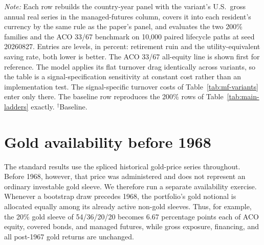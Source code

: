 \documentclass[11pt]{article}
\begin{document}
\begin{table}[H]
\centering
\caption{Lifecycle outcomes with each managed-futures variant in the sleeve}
\label{tab:mf-variant-lifecycle}
\small

\begin{minipage}{0.94\textwidth}\footnotesize
\textit{Note:} Each row rebuilds the country-year panel with the variant's
U.S.\ gross annual real series in the managed-futures column, covers it into
each resident's currency by the same rule as the paper's panel, and evaluates
the two 200\% families and the ACO 33/67 benchmark on 10,000 paired
lifecycle paths at seed 20260827. Entries are levels, in percent: retirement
ruin and the utility-equivalent saving rate, both lower is better. The ACO
33/67 all-equity line is shown first for reference. The model applies its flat
turnover drag identically across variants, so the table is a
signal-specification sensitivity at constant cost rather than an
implementation test. The signal-specific turnover costs of
Table~\ref{tab:mf-variants} enter only there. The baseline row
reproduces the 200\% rows of Table~\ref{tab:main-ladders} exactly.
$^{\dagger}$Baseline.
\end{minipage}
\end{table}

\section{Gold availability before 1968}
\label{app:gold-availability}

The standard results use the spliced historical gold-price series throughout.
Before 1968, however, that price was administered and does not represent an
ordinary investable gold sleeve. We therefore run a separate availability
exercise. Whenever a bootstrap draw precedes 1968, the portfolio's gold
notional is allocated equally among its already active non-gold sleeves. Thus,
for example, the 20\% gold sleeve of 54/36/20/20 becomes 6.67 percentage points
each of ACO equity, covered bonds, and managed futures, while gross exposure,
financing, and all post-1967 gold returns are unchanged.
\end{document}
